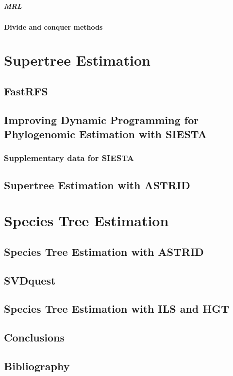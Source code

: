 \documentclass[edeposit,fullpage]{uiucthesis2014}
\theoremstyle{definition}
\begin{document}
\subsubsection{MRL}
\subsection{Divide and conquer methods}

\part{Supertree Estimation}
\label{part:supertree}

\chapter{FastRFS}
\label{chapter:fastrfs}


\chapter{Improving Dynamic Programming for Phylogenomic Estimation
  with SIESTA}
\label{chapter:siesta}

\section{Supplementary data for SIESTA}


\chapter{Supertree Estimation with ASTRID}
\label{chapter:astrid-missing}





\part{Species Tree Estimation}
\label{part:speciestree}

\chapter{Species Tree Estimation with ASTRID}
\label{chapter:astrid}



\chapter{SVDquest}
\label{chapter:svdquest}


\chapter{Species Tree Estimation with ILS and HGT}
\label{chapter:hgt}



\chapter{Conclusions}

\chapter{Bibliography}
\printbibliography

\backmatter
\end{document}
